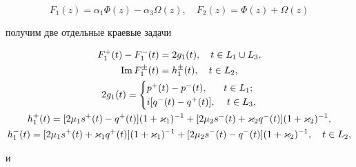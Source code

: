 \begin{equation} 


F_1(z)=\alpha_1\Phi(z)-\alpha_3\Omega(z),\quad 


F_2(z)=\Phi(z)+\Omega(z) 


\end{equation} 


получим две отдельные краевые задачи 


\begin{gather} 


F^+_1(t)-F^-_1(t)=2g_1(t),\quad t\in L_1\cup L_3,\\ 


\im F^\pm_1(t)=h^\pm_1(t),\quad t\in L_2,\notag \\ 


2g_1(t)= 


\begin{cases} 


p^+(t)-p^-(t), & t\in L_1;\\ 


i[q^-(t)-q^+(t)], &\ t\in L_3, 


\end{cases} 


\notag \\ 


h^+_1(t)=[2\mu_1s^+(t)-q^+(t)](1+\varkappa_1)^{-1}+ 


[2\mu_2s^-(t)+\varkappa_2q^-(t)](1+\varkappa_2)^{-1},\notag \\ 


h^-_1(t)=[2\mu_1s^+(t)+\varkappa_1q^+(t)](1+\varkappa_1)^{-1}+ 


[2\mu_2s^-(t)-q^-(t)](1+\varkappa_2)^{-1},\quad t\in L_2, \notag


\end{gather} 


и 


